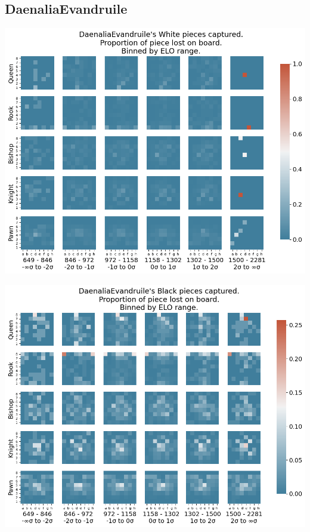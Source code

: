 \documentclass[11pt]{article}
\begin{document}
\subsection{DaenaliaEvandruile}
\label{sec:org346dd35}
\begin{center}
\includegraphics[width=\textwidth]{Images/DaenaliaEvandruile_HEATMAP_Queen_Rook_Bishop_Knight_Pawn_WHITE_ELO.png}
\end{center}

\begin{center}
\includegraphics[width=\textwidth]{Images/DaenaliaEvandruile_HEATMAP_Queen_Rook_Bishop_Knight_Pawn_BLACK_ELO.png}
\end{center}
\end{document}
